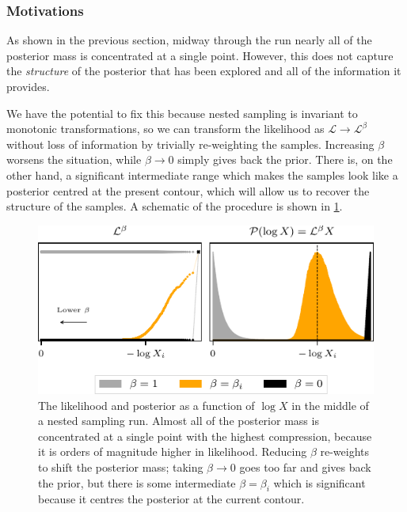 \documentclass[usenatbib]{mnras}
\newcommand{\Like}{\mathcal{L}}
\begin{document}
\subsubsection*{Motivations}
As shown in the previous section, midway through the run nearly all of the posterior mass is concentrated at a single point. However, this does not capture the \textit{structure} of the posterior that has been explored and all of the information it provides. 
\par
We have the potential to fix this because nested sampling is invariant to monotonic transformations, so we can transform the likelihood as $\Like \to \Like^{\beta}$ without loss of information by trivially re-weighting the samples. Increasing $\beta$ worsens the situation, while $\beta \to 0$ simply gives back the prior. There is, on the other hand, a significant intermediate range which makes the samples look like a posterior centred at the present contour, which will allow us to recover the structure of the samples. A schematic of the procedure is shown in \cref{fig:last_live_point}.
\par
\begin{figure}
\begin{center}
    \includegraphics{figures/last_live_point.pdf}
\end{center}
\caption{The likelihood and posterior as a function of $\log X$ in the middle of a nested sampling run. Almost all of the posterior mass is concentrated at a single point with the highest compression, because it is orders of magnitude higher in likelihood. Reducing $\beta$ re-weights to shift the posterior mass; taking $\beta \to 0$ goes too far and gives back the prior, but there is some intermediate $\beta = \beta_i$ which is significant because it centres the posterior at the current contour.}
\label{fig:last_live_point}
\end{figure}
\par
\end{document}

